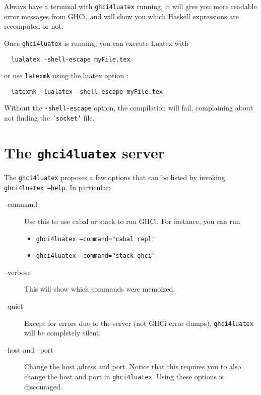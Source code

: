 \documentclass{article}
\begin{document}
\begin{tipbox}
Always have a terminal with \texttt{ghci4luatex} running, it will give you more readable error messages from GHCi, and will show you which Haskell expressions are recomputed or not.
\end{tipbox}


Once \texttt{ghci4luatex} is running, you can execute Luatex with

\begin{verbatim}
  lualatex -shell-escape myFile.tex
\end{verbatim}

or use \texttt{latexmk} using the luatex option :

\begin{verbatim}
  latexmk -lualatex -shell-escape myFile.tex
\end{verbatim}

\begin{warningbox}
  Without the \texttt{-shell-escape} option, the compilation will fail, complaining about not finding the \texttt{'socket'} file.
\end{warningbox}

\section{The \texttt{ghci4luatex} server}

The  \texttt{ghci4luatex} proposes a few options that can be listed by invoking \texttt{ghci4luatex --help}. In particular:

\begin{description}
  \item[--command] Use this to use cabal or stack to run GHCi. For instance, you can run \begin{itemize}
    \item \texttt{ghci4luatex --command="cabal repl"}
    \item \texttt{ghci4luatex --command="stack ghci"}
  \end{itemize}
  \item[--verbose] This will show which commands were memoized.
  \item[--quiet] Except for errors due to the server (not GHCi error dumps), \texttt{ghci4luatex} will be completely silent.
  \item[--host and --port] Change the host adress and port. Notice that this requires you to also change the host and port in \texttt{ghci4luatex}. Using these options is discouraged.
\end{description}
\end{document}
